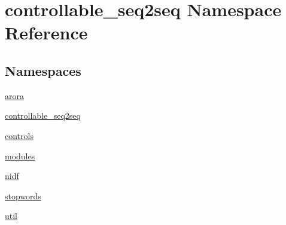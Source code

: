 \hypertarget{namespacecontrollable__seq2seq}{}\section{controllable\+\_\+seq2seq Namespace Reference}
\label{namespacecontrollable__seq2seq}
\subsection*{Namespaces}
\begin{DoxyCompactItemize}
\item 
 \hyperlink{namespacecontrollable__seq2seq_1_1arora}{arora}
\item 
 \hyperlink{namespacecontrollable__seq2seq_1_1controllable__seq2seq}{controllable\+\_\+seq2seq}
\item 
 \hyperlink{namespacecontrollable__seq2seq_1_1controls}{controls}
\item 
 \hyperlink{namespacecontrollable__seq2seq_1_1modules}{modules}
\item 
 \hyperlink{namespacecontrollable__seq2seq_1_1nidf}{nidf}
\item 
 \hyperlink{namespacecontrollable__seq2seq_1_1stopwords}{stopwords}
\item 
 \hyperlink{namespacecontrollable__seq2seq_1_1util}{util}
\end{DoxyCompactItemize}
